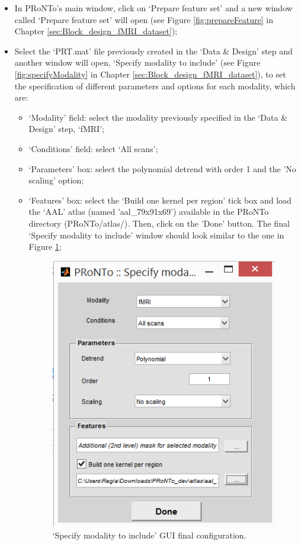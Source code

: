 \begin{itemize}
	
	\item In PRoNTo's main window, click on `Prepare feature set' and a new window called `Prepare feature set' will open (see Figure \ref{fig:prepareFeature} in Chapter \ref{sec:Block_design_fMRI_dataset});
	
	\item Select the `PRT.mat' file previously created in the `Data \& Design' step and another window will open, `Specify modality to include' (see Figure \ref{fig:specifyModality} in Chapter \ref{sec:Block_design_fMRI_dataset}), to set the specification of different parameters and options for each modality, which are: 
	
	\begin{itemize}
		\item `Modality' field: select the modality previously specified in the `Data \& Design' step, `fMRI';

		\item `Conditions' field: select `All scans'; 
		
		\item `Parameters' box: select the polynomial detrend with order 1 and the 'No scaling' option;
		\item `Features' box: select the `Build one kernel per region' tick box and load the `AAL' atlas (named 'aal\_79x91x69') available in the PRoNTo directory (PRoNTo/atlas/). Then, click on the 'Done' button. The final `Specify modality to include' window should look similar to the one in Figure \ref{fig:specifyModalitymkl};
		
			
		\begin{figure}[!h]
	\centering
		\includegraphics[scale=0.75]{images/Tutorial/mkl/specifyModalitymkl.png}
	\caption{`Specify modality to include' GUI final configuration.}
	\label{fig:specifyModalitymkl}
\end{figure}	
		

\end{itemize}
\end{itemize}
